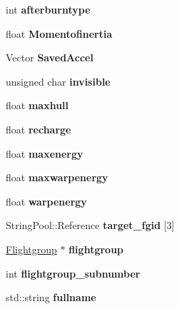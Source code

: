 \begin{DoxyCompactItemize}
\item 
int {\bfseries afterburntype}\hypertarget{classUnit_ab9b0355453f311d8fa0a76d8b952bdec}{}\label{classUnit_ab9b0355453f311d8fa0a76d8b952bdec}

\item 
float {\bfseries Momentofinertia}\hypertarget{classUnit_ac62bba1c93df51c45a4a04716b657296}{}\label{classUnit_ac62bba1c93df51c45a4a04716b657296}

\item 
Vector {\bfseries Saved\+Accel}\hypertarget{classUnit_ab5d01eb6f3046651071bb305d2cd818f}{}\label{classUnit_ab5d01eb6f3046651071bb305d2cd818f}

\item 
unsigned char {\bfseries invisible}\hypertarget{classUnit_a4594d664b9bf9dcd0d1fe864ca4bdc2b}{}\label{classUnit_a4594d664b9bf9dcd0d1fe864ca4bdc2b}

\item 
float {\bfseries maxhull}\hypertarget{classUnit_a5a1ecd7661f365188f7c4b3f24da100d}{}\label{classUnit_a5a1ecd7661f365188f7c4b3f24da100d}

\item 
float {\bfseries recharge}\hypertarget{classUnit_a8063b9b017dc6441211a6abc4ca23f4b}{}\label{classUnit_a8063b9b017dc6441211a6abc4ca23f4b}

\item 
float {\bfseries maxenergy}\hypertarget{classUnit_afa0639ce36fe344007da81a196e4799b}{}\label{classUnit_afa0639ce36fe344007da81a196e4799b}

\item 
float {\bfseries maxwarpenergy}\hypertarget{classUnit_a68f0004b07fe902722fa34953fb973a7}{}\label{classUnit_a68f0004b07fe902722fa34953fb973a7}

\item 
float {\bfseries warpenergy}\hypertarget{classUnit_a16b64da8cd305518e2fc7184680558af}{}\label{classUnit_a16b64da8cd305518e2fc7184680558af}

\item 
String\+Pool\+::\+Reference {\bfseries target\+\_\+fgid} \mbox{[}3\mbox{]}\hypertarget{classUnit_a0f206351d7bc24d6af6ac37f3d8bfd73}{}\label{classUnit_a0f206351d7bc24d6af6ac37f3d8bfd73}

\item 
\hyperlink{classFlightgroup}{Flightgroup} $\ast$ {\bfseries flightgroup}\hypertarget{classUnit_a5eebce03e9f641f1150b4e08f09176c2}{}\label{classUnit_a5eebce03e9f641f1150b4e08f09176c2}

\item 
int {\bfseries flightgroup\+\_\+subnumber}\hypertarget{classUnit_a88829d2efbd0a225327d1076a68d34e3}{}\label{classUnit_a88829d2efbd0a225327d1076a68d34e3}

\item 
std\+::string {\bfseries fullname}\hypertarget{classUnit_ad8847af8e59f7f0d3a784bff0dfc31ff}{}\label{classUnit_ad8847af8e59f7f0d3a784bff0dfc31ff}

\end{DoxyCompactItemize}

